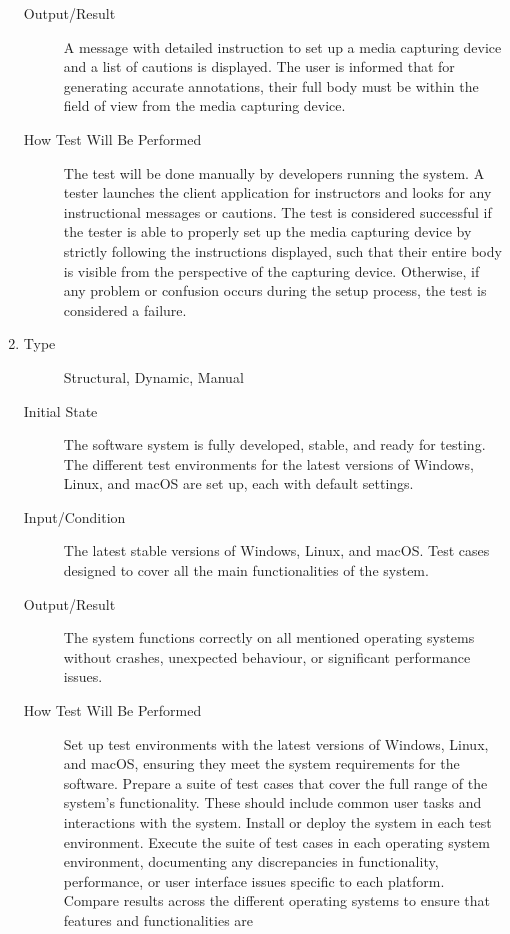 \documentclass[12pt, titlepage]{article}
\begin{document}
\begin{enumerate}[NFR-T1]
\begin{description}
  \item[Output/Result] A message with detailed instruction to set up a media
    capturing device and a list of cautions is displayed. The user is informed
    that for generating accurate annotations, their full body must be within the
    field of view from the media capturing device.
  \item[How Test Will Be Performed] The test will be done manually by developers
    running the system. A tester launches the client application for instructors
    and looks for any instructional messages or cautions. The test is considered
    successful if the tester is able to properly set up the media capturing
    device by strictly following the instructions displayed, such that their
    entire body is visible from the perspective of the capturing device.
    Otherwise, if any problem or confusion occurs during the setup process, the
    test is considered a failure.
  \end{description}
\item \label{NFRT16}
  \begin{description}
  \item[Type] Structural, Dynamic, Manual
  \item[Initial State] The software system is fully developed, stable, and ready
    for testing. The different test environments for the latest versions of
    Windows, Linux, and macOS are set up, each with default settings.
  \item[Input/Condition] The latest stable versions of Windows, Linux, and
    macOS. Test cases designed to cover all the main functionalities of the
    system.
  \item[Output/Result] The system functions correctly on all mentioned operating
    systems without crashes, unexpected behaviour, or significant performance
    issues.
  \item[How Test Will Be Performed] Set up test environments with the latest
    versions of Windows, Linux, and macOS, ensuring they meet the system
    requirements for the software. Prepare a suite of test cases that cover the
    full range of the system's functionality. These should include common user
    tasks and interactions with the system. Install or deploy the system in each
    test environment. Execute the suite of test cases in each operating system
    environment, documenting any discrepancies in functionality, performance, or
    user interface issues specific to each platform. Compare results across the
    different operating systems to ensure that features and functionalities are

\end{description}
\end{enumerate}
\end{document}
